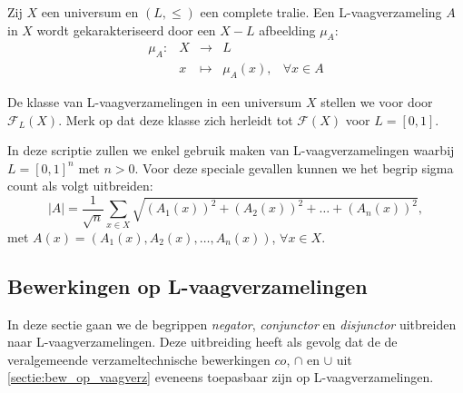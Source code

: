 
\begin{definitie}
Zij $X$ een universum en $(L,\le)$ een complete tralie. Een L-vaagverzameling $A$ in $X$ wordt
gekarakteriseerd door een $X - L$ afbeelding $\mu_A$:
$$
\begin{array}{lllll}
\mu_A: 	& X & \to 		& L	& \\
		& x & \mapsto 	& \mu_A(x),		& \forall x \in A
\end{array}
$$
\end{definitie}
\noindent
De klasse van L-vaagverzamelingen in een universum $X$ stellen we voor door 
$\mathcal{F}_L(X)$. Merk op dat deze klasse zich herleidt tot $\mathcal{F}(X)$ voor $L = [0,1]$.

In deze scriptie zullen we enkel gebruik maken van L-vaagverzamelingen waarbij
$L = [0,1]^n$ met $n > 0$. Voor deze speciale gevallen kunnen we het begrip sigma count als volgt 
uitbreiden:
$$
|A|=\frac{1}{\sqrt{n}}\sum_{x \in X}\sqrt{(A_1(x))^2+(A_2(x))^2+\ldots+(A_n(x))^2},
$$
met $A(x)=(A_1(x),A_2(x),\ldots,A_n(x))$, $\forall x \in X$.  

\subsection{Bewerkingen op L-vaagverzamelingen}

In deze sectie gaan we de begrippen \emph{negator}, \emph{conjunctor} en 
\emph{disjunctor} uitbreiden naar L-vaag\-ver\-za\-me\-ling\-en. Deze uitbreiding heeft als gevolg dat de
de veralgemeende verzameltechnische bewerkingen $co$, $\cap$ en 
$\cup$ uit \ref{sectie:bew_op_vaagverz} eveneens toepasbaar zijn op L-vaagverzamelingen.

